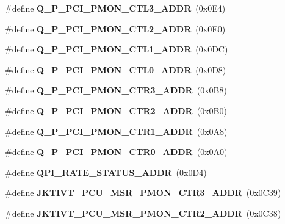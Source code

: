 \begin{DoxyCompactItemize}
\item 
\#define {\bfseries Q\+\_\+\+P\+\_\+\+P\+C\+I\+\_\+\+P\+M\+O\+N\+\_\+\+C\+T\+L3\+\_\+\+A\+D\+DR}~(0x0\+E4)\label{types_8h_a61bcadc16b6f19e0d5b8f6c975fa641e}

\item 
\#define {\bfseries Q\+\_\+\+P\+\_\+\+P\+C\+I\+\_\+\+P\+M\+O\+N\+\_\+\+C\+T\+L2\+\_\+\+A\+D\+DR}~(0x0\+E0)\label{types_8h_afc483051e408adfbe86571ad821d9e4f}

\item 
\#define {\bfseries Q\+\_\+\+P\+\_\+\+P\+C\+I\+\_\+\+P\+M\+O\+N\+\_\+\+C\+T\+L1\+\_\+\+A\+D\+DR}~(0x0\+D\+C)\label{types_8h_a4d6a4c1abdae11ab4c6616b473ad315c}

\item 
\#define {\bfseries Q\+\_\+\+P\+\_\+\+P\+C\+I\+\_\+\+P\+M\+O\+N\+\_\+\+C\+T\+L0\+\_\+\+A\+D\+DR}~(0x0\+D8)\label{types_8h_a5d9c2ce10cf815eb05a1c2fa09875850}

\item 
\#define {\bfseries Q\+\_\+\+P\+\_\+\+P\+C\+I\+\_\+\+P\+M\+O\+N\+\_\+\+C\+T\+R3\+\_\+\+A\+D\+DR}~(0x0\+B8)\label{types_8h_a6c6ae71785936eb30a2be9586e239ff3}

\item 
\#define {\bfseries Q\+\_\+\+P\+\_\+\+P\+C\+I\+\_\+\+P\+M\+O\+N\+\_\+\+C\+T\+R2\+\_\+\+A\+D\+DR}~(0x0\+B0)\label{types_8h_a4053d31c743c734b64e7326617823ee8}

\item 
\#define {\bfseries Q\+\_\+\+P\+\_\+\+P\+C\+I\+\_\+\+P\+M\+O\+N\+\_\+\+C\+T\+R1\+\_\+\+A\+D\+DR}~(0x0\+A8)\label{types_8h_aae73f1b8f3a0d7a574395a7b472e1fd6}

\item 
\#define {\bfseries Q\+\_\+\+P\+\_\+\+P\+C\+I\+\_\+\+P\+M\+O\+N\+\_\+\+C\+T\+R0\+\_\+\+A\+D\+DR}~(0x0\+A0)\label{types_8h_aadb5219a896f99247fd4cd0ab62c656c}

\item 
\#define {\bfseries Q\+P\+I\+\_\+\+R\+A\+T\+E\+\_\+\+S\+T\+A\+T\+U\+S\+\_\+\+A\+D\+DR}~(0x0\+D4)\label{types_8h_acfc0a6e15dc1a230627717789bf9ccce}

\item 
\#define {\bfseries J\+K\+T\+I\+V\+T\+\_\+\+P\+C\+U\+\_\+\+M\+S\+R\+\_\+\+P\+M\+O\+N\+\_\+\+C\+T\+R3\+\_\+\+A\+D\+DR}~(0x0\+C39)\label{types_8h_a94e80e664b4d2b604128bef0be06fe10}

\item 
\#define {\bfseries J\+K\+T\+I\+V\+T\+\_\+\+P\+C\+U\+\_\+\+M\+S\+R\+\_\+\+P\+M\+O\+N\+\_\+\+C\+T\+R2\+\_\+\+A\+D\+DR}~(0x0\+C38)\label{types_8h_a885b6391b439a80833f8ef07cd3234d5}


\end{DoxyCompactItemize}
